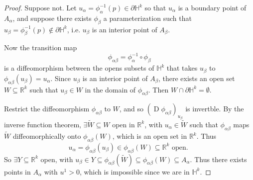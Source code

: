 \documentclass[notoc,notitlepage]{tufte-book}
\DeclareMathOperator{\D}{D}
\begin{document}
\begin{proof}
  Suppose not. Let $u_\alpha = \phi_\alpha^{-1}(p) \in \partial \mathbb{H}^k$ so
  that $u_\alpha$ is a boundary point of $A_\alpha$, and suppose there exists
  $\phi_\beta$ a parameterization such that $u_\beta = \phi_\beta^{-1}(p) \notin
  \partial \mathbb{H}^k$, i.e. $u_\beta$ is an interior point of $A_\beta$.

  Now the transition map
  \begin{equation*}
    \phi_{\alpha\beta} = \phi_\alpha^{-1} \circ \phi_\beta
  \end{equation*}
  is a diffeomorphism between the opens subsets of $\mathbb{H}^k$ that takes
  $u_\beta$ to $\phi_{\alpha\beta}(u_\beta) = u_\alpha$. Since $u_\beta$ is an
  interior point of $A_\beta$, there exists an open set $W \subseteq
  \mathbb{R}^k$ such that $u_\beta \in W$ in the domain of $\phi_{\alpha\beta}$.
  Then $W \cap \partial \mathbb{H}^k = \emptyset$.

  Restrict the diffeomorphism $\phi_{\alpha\beta}$ to $W$, and so $(\D
  \phi_{\alpha\beta})_{u_\beta}$ is invertble. By the inverse function theorem,
  $\exists \tilde{W} \subseteq W$ open in $\mathbb{R}^k$, with $u_\alpha \in
  \tilde{W}$ such that $\phi_{\alpha\beta}$ maps $\tilde{W}$ diffeomorphically
  onto $\phi_{\alpha\beta}(W)$, which is an open set in $\mathbb{R}^k$. Thus
  \begin{equation*}
    u_\alpha = \phi_{\alpha\beta}(u_\beta) \in \phi_{\alpha\beta} (W) \subseteq
    \mathbb{R}^k \text{ open. }
  \end{equation*}
  So $\exists Y \subseteq \mathbb{R}^k$ open, with $u_\beta \in Y \subseteq
  \phi_{\alpha\beta}(\tilde{W}) \subseteq \phi_{\alpha\beta}(W) \subseteq
  A_{\alpha}$. Thus there exists points in $A_\alpha$ with $u^1 > 0$, which is
  impossible since we are in $\mathbb{H}^k$.
\end{proof}
\end{document}
